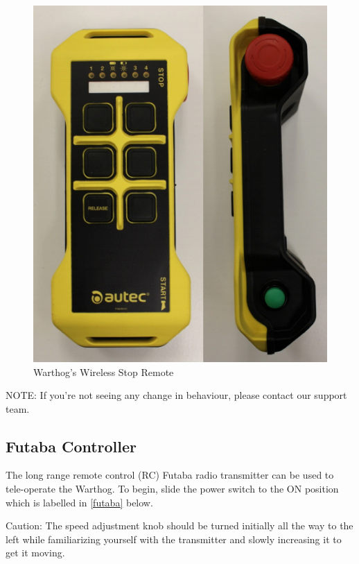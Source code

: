 \documentclass[]{clearpath-latex/clearpath-manual}
\begin{document}
\begin{figure}[!h]
  \centering
  \includegraphics[width=1.0\linewidth]{graphics/wireless-stop-remote.png}
  \caption{Warthog's Wireless Stop Remote}
  \label{wireless-stop}
\end{figure}


NOTE: If you’re not seeing any change in behaviour, please contact our support team.

\pagebreak[4]

\subsection{Futaba Controller}

The long range remote control (RC) Futaba radio transmitter can be used to tele-operate the Warthog.
To begin, slide the power switch to the ON position which is labelled in
\autoref{futaba} below.

\begin{warning}[]
Caution: The speed adjustment knob should be turned initially all the way to the left while familiarizing yourself with the transmitter and slowly increasing it to get it moving.
\end{warning}
\end{document}
